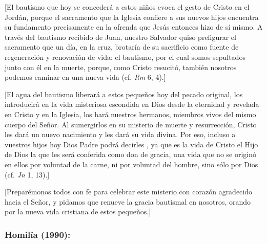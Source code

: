 \begin{body}
					{[}El bautismo que hoy se concederá a estos niños evoca el gesto de Cristo en el Jordán, porque el sacramento que la Iglesia confiere a sus nuevos hijos encuentra su fundamento precisamente en la ofrenda que Jesús entonces hizo de sí mismo. A través del bautismo recibido de Juan, nuestro Salvador quiso prefigurar el sacramento que un día, en la cruz, brotaría de su sacrificio como fuente de regeneración y renovación de vida: el bautismo, por el cual somos sepultados junto con él en la muerte, porque, como Cristo resucitó, también nosotros podemos caminar en una nueva vida (cf. \emph{Rm} 6, 4).{]}
					
					{[}El agua del bautismo liberará a estos pequeños hoy del pecado original, los introducirá en la vida misteriosa escondida en Dios desde la eternidad y revelada en Cristo y en la Iglesia, los hará nuestros hermanos, miembros vivos del mismo cuerpo del Señor. Al sumergirlos en su misterio de muerte y resurrección, Cristo les dará un nuevo nacimiento y les dará su vida divina. Por eso, incluso a vuestros hijos hoy Dios Padre podrá decirles , ya que es la vida de Cristo el Hijo de Dios la que les será conferida como don de gracia, una vida que no se originó en ellos por voluntad de la carne, ni por voluntad del hombre, sino sólo por Dios (cf. \emph{Jn} 1, 13).{]}
					
					{[}Preparémonos todos con fe para celebrar este misterio con corazón agradecido hacia el Señor, y pidamos que renueve la gracia bautismal en nosotros, orando por la nueva vida cristiana de estos pequeños.{]}
				\end{body}
			
			\subsubsection{Homilía (1990):}
			
				
